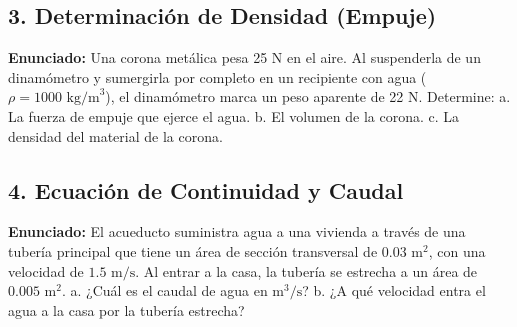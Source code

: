 \documentclass[12pt, letterpaper]{article}
\begin{document}
	\subsection*{3. Determinación de Densidad (Empuje)}
	\noindent \textbf{Enunciado:} Una corona metálica pesa 25 N en el aire. Al suspenderla de un dinamómetro y sumergirla por completo en un recipiente con agua ($\rho = 1000 \text{ kg/m}^3$), el dinamómetro marca un peso aparente de 22 N. Determine: a. La fuerza de empuje que ejerce el agua. b. El volumen de la corona. c. La densidad del material de la corona.
	
	
	\subsection*{4. Ecuación de Continuidad y Caudal}
	\noindent \textbf{Enunciado:} El acueducto suministra agua a una vivienda a través de una tubería principal que tiene un área de sección transversal de $0.03 \text{ m}^2$, con una velocidad de $1.5 \text{ m/s}$. Al entrar a la casa, la tubería se estrecha a un área de $0.005 \text{ m}^2$. a. ¿Cuál es el caudal de agua en $\text{m}^3\text{/s}$? b. ¿A qué velocidad entra el agua a la casa por la tubería estrecha?
	
	
\end{document}

